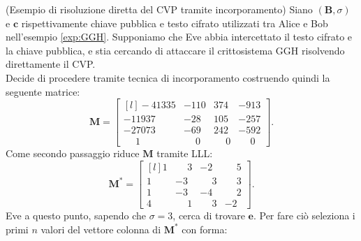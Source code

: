 \begin{exmp} (Esempio di risoluzione diretta del CVP tramite incorporamento)
\label{exp:embedding}
Siano $(\mathbf{B}, \sigma)$ e $\mathbf{c}$ rispettivamente chiave pubblica e testo cifrato
utilizzati tra Alice e Bob nell'esempio \ref{exp:GGH}. Supponiamo che Eve abbia intercettato 
il testo cifrato e la chiave pubblica, e stia cercando di attaccare il crittosistema GGH
risolvendo direttamente il CVP.\\ Decide di procedere tramite tecnica di incorporamento
costruendo quindi la seguente matrice:
\begin{equation*}
    \mathbf{M} =
    \begin{bmatrix*}[l]
        -41335 & -110 & 374 & -913\\
        -11937 & -28 & 105 & -257\\
        -27073 & -69 & 242 & -592 \\
        \phantom{-}1 & \phantom{-}0 & \phantom{-}0 & \phantom{-}0
    \end{bmatrix*}.
\end{equation*}
Come secondo passaggio riduce $\mathbf{M}$ tramite LLL:
\begin{equation*}
    \mathbf{M}^* =
    \begin{bmatrix*}[l]
        1 & \phantom{-}3  &           -2 & \phantom{-}5\\
        1 &          -3   & \phantom{-}3 & \phantom{-}3\\
        1 &          -3   &           -4 & \phantom{-}2 \\
        4 & \phantom{-}1  & \phantom{-}3 & -2
    \end{bmatrix*}.
\end{equation*}
Eve a questo punto, sapendo che $\sigma = 3$, cerca di trovare $\mathbf{e}$. 
Per fare ciò seleziona i primi $n$ valori del vettore colonna  di $\mathbf{M}^*$ 
con forma:


\end{exmp}
